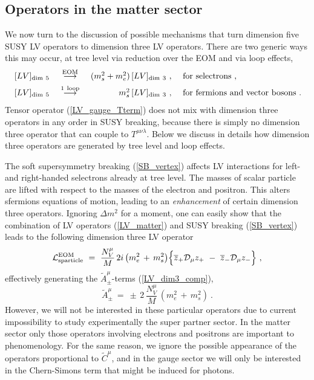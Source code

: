 \documentclass[12pt]{revtex4}
\begin{document}
\subsection{Operators in the matter sector}


We now turn to the discussion of possible mechanisms that turn
dimension five SUSY LV operators 
 to dimension three LV operators. There are two generic ways this 
may occur, at tree level via reduction over the EOM and via loop
effects,   
\begin{equation}
\begin{array}{l c r l} 
\, [LV]_{\rm dim~5} & ~\stackrel{\mathrm {EOM}}{\longrightarrow}~ &
  (m_{s}^2 + m_e^2)\, [LV]_{\rm dim~3}~,~ &{\rm for~selectrons}~, 
\\[1ex] \,
[LV]_{\rm dim~5} &~ \stackrel{\mathrm {1\ loop}}{\longrightarrow}~ &
  m_{s}^2\, [LV]_{\rm dim~3}~,~ & {\rm for~fermions ~and ~vector~bosons}
~.
\end{array}
\nonumber
\end{equation}
%
Tensor operator (\ref{LV_gauge_Tterm}) does not mix with dimension
three operators in any order in SUSY breaking, because there is simply
no dimension three operator that can couple to
$T^{\mu\nu\lambda}$. Below we discuss in details how dimension
three operators are generated by tree level and loop effects. 


The soft supersymmetry breaking (\ref{SB_vertex}) affects LV
interactions for left- and right-handed selectrons already at tree
level. The  masses of scalar particle are lifted with respect to the
masses of the electron and positron. This alters sfermions equations
of motion, leading to an {\em enhancement} of certain dimension three
operators. Ignoring $\Delta m^2$ for a moment, one can easily show
that the combination of LV operators (\ref{LV_matter}) and SUSY
breaking (\ref{SB_vertex}) leads to the following dimension three LV
operator 
%
\begin{equation}
  \mathcal{L}_{\rm sparticle}^{\rm EOM} ~=~  
\frac{N_V^\mu}{M}\, 2 i\, 
\big(
m_e^2 \,+\,  m_s^2
\big)
\Bigl\{ 
\overline{z}_+ \mathcal{D}_\mu z_+ 
~-~
\overline{z}_- \mathcal{D}_\mu z_- 
\Bigr\}~,  
\end{equation}
%
effectively generating the $ \widetilde{A}^\mu_\pm $-terms
%
(\ref{LV_dim3_comp}), 
 \begin{equation}
\widetilde{A}_\pm^\mu ~=~  
\pm\, 2\, \frac{N_V^\mu}{ M }   \, 
(m_e^2 \, +\,  m_s^2)~.
\end{equation}
%
However, we will not be interested in these particular operators due
to current impossibility to study experimentally  the super partner
sector. In the matter sector only those operators involving electrons
and positrons are important to phenomenology.  
For the same reason, we ignore the possible appearance of the
operators proportional to $ \widetilde{C}^\mu $, and in the gauge
sector we will only be interested in the Chern-Simons term that might
be induced for photons. 
\end{document}
